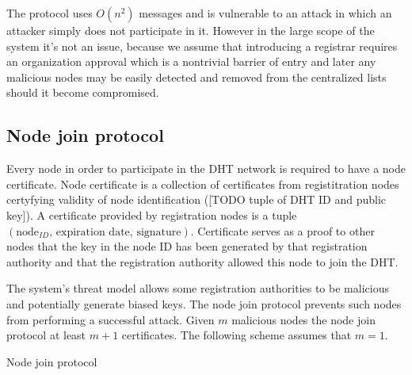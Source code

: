 The protocol uses $O\left(n^2\right)$ messages and is vulnerable to an attack in
which an attacker simply does not participate in it. However in the large scope
of the system it's not an issue, because we assume that introducing a registrar
requires an organization approval which is a nontrivial barrier of entry and
later any malicious nodes may be easily detected and removed from the
centralized lists should it become compromised.

\subsection{Node join protocol}

Every node in order to participate in the DHT network is required to have a node
certificate. Node certificate is a collection of certificates from registitration
nodes certyfying validity of node identification ([TODO tuple of DHT ID and
public key]). A certificate provided by registration nodes is a tuple
$\left(\text{node}_{ID}, \, \text{expiration date}, \, \text{signature}\right)$.
Certificate serves as a proof to other nodes that the key in the node ID has been
generated by that registration authority and that the registration authority
allowed this node to join the DHT.

The system's threat model allows some registration authorities to be malicious
and potentially generate biased keys. The node join protocol prevents such nodes
from performing a successful attack. Given $m$ malicious nodes the node join
protocol at least $m+1$ certificates. The following scheme assumes that $m = 1$.

\begin{msc}{Node join protocol}
\setlength{\instdist}{5.5cm}
\setlength{\envinstdist}{3cm}
\nextlevel[2]
\nextlevel
{}
\nextlevel[4]
\nextlevel[2]
\nextlevel[2]
\nextlevel[2]
\nextlevel[2]
\nextlevel[2]
\nextlevel[2]
\nextlevel[2]
\nextlevel[1]
\end{msc}


